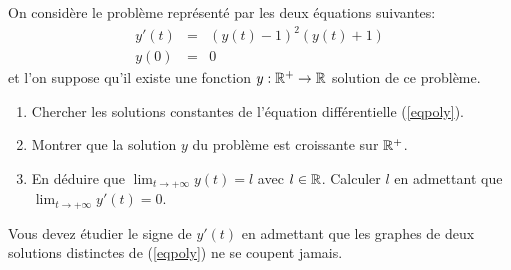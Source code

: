 \documentclass[11pt,class=report,crop=false]{standalone}
\begin{document}

\exercice{}
\enonce
On considère le problème représenté par les deux équations suivantes:
            \begin{eqnarray}
                y'(t) & = & (y(t)-1)^2(y(t)+1)\label{eqpoly}\\
                y(0) & = & 0 \label{cipoly}
            \end{eqnarray}
            et l'on suppose qu'il existe une fonction $ y:\mathbb{R}^+\to\mathbb{R}$ solution de ce problème.
            \begin{enumerate}
                \item Chercher les solutions constantes de l'équation différentielle 
                      (\ref{eqpoly}).
                \item Montrer que la solution $y$ du problème est croissante sur $\mathbb{R}^+$.
                \item En déduire que $\displaystyle \lim_{t\to +\infty}y(t)=l$ avec $l \in
                  \mathbb{R} $. Calculer $l$ en admettant que $\displaystyle \lim_{t\to +\infty}y'(t)=0$.
            \end{enumerate}
\finenonce

\indication
Vous devez étudier le signe de $ y'(t) $ en admettant que les graphes 
de deux solutions distinctes de (\ref{eqpoly}) ne se coupent jamais. 
\finindication

\correction

\end{document}
